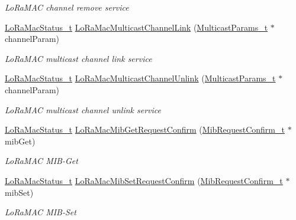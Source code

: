 \begin{DoxyCompactItemize}
\begin{DoxyCompactList}\small\item\em Lo\+Ra\+M\+AC channel remove service \end{DoxyCompactList}\item 
\mbox{\hyperlink{group___l_o_r_a_m_a_c_ga30bd25657e10480f8605ee951b0ecfbd}{Lo\+Ra\+Mac\+Status\+\_\+t}} \mbox{\hyperlink{group___l_o_r_a_m_a_c_ga89622bf6a1705558ba7b76dbb2d59c2f}{Lo\+Ra\+Mac\+Multicast\+Channel\+Link}} (\mbox{\hyperlink{group___l_o_r_a_m_a_c_ga02d2523505cac70954c043074087ea65}{Multicast\+Params\+\_\+t}} $\ast$channel\+Param)
\begin{DoxyCompactList}\small\item\em Lo\+Ra\+M\+AC multicast channel link service \end{DoxyCompactList}\item 
\mbox{\hyperlink{group___l_o_r_a_m_a_c_ga30bd25657e10480f8605ee951b0ecfbd}{Lo\+Ra\+Mac\+Status\+\_\+t}} \mbox{\hyperlink{group___l_o_r_a_m_a_c_ga1542a215938fcff1d665ae48b449335e}{Lo\+Ra\+Mac\+Multicast\+Channel\+Unlink}} (\mbox{\hyperlink{group___l_o_r_a_m_a_c_ga02d2523505cac70954c043074087ea65}{Multicast\+Params\+\_\+t}} $\ast$channel\+Param)
\begin{DoxyCompactList}\small\item\em Lo\+Ra\+M\+AC multicast channel unlink service \end{DoxyCompactList}\item 
\mbox{\hyperlink{group___l_o_r_a_m_a_c_ga30bd25657e10480f8605ee951b0ecfbd}{Lo\+Ra\+Mac\+Status\+\_\+t}} \mbox{\hyperlink{group___l_o_r_a_m_a_c_ga3e208a4f73213aa801eeb9d9da7b71dd}{Lo\+Ra\+Mac\+Mib\+Get\+Request\+Confirm}} (\mbox{\hyperlink{group___l_o_r_a_m_a_c_ga9269d5ae88dd157a58e9d60f680d63f0}{Mib\+Request\+Confirm\+\_\+t}} $\ast$mib\+Get)
\begin{DoxyCompactList}\small\item\em Lo\+Ra\+M\+AC M\+I\+B-\/\+Get \end{DoxyCompactList}\item 
\mbox{\hyperlink{group___l_o_r_a_m_a_c_ga30bd25657e10480f8605ee951b0ecfbd}{Lo\+Ra\+Mac\+Status\+\_\+t}} \mbox{\hyperlink{group___l_o_r_a_m_a_c_ga7a4ee0ced221591206b09630d4a70844}{Lo\+Ra\+Mac\+Mib\+Set\+Request\+Confirm}} (\mbox{\hyperlink{group___l_o_r_a_m_a_c_ga9269d5ae88dd157a58e9d60f680d63f0}{Mib\+Request\+Confirm\+\_\+t}} $\ast$mib\+Set)
\begin{DoxyCompactList}\small\item\em Lo\+Ra\+M\+AC M\+I\+B-\/\+Set \end{DoxyCompactList}\item 

\end{DoxyCompactItemize}
